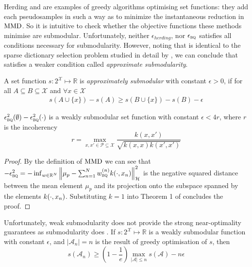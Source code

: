 \documentclass[]{article}
\begin{document}
Herding and \sbq{} are examples of greedy algorithms optimising set functions: they add each pseudosamples in such a way as to minimize the instantaneous reduction in ${\rm MMD}$. So it is intuitive to check whether the objective functions these methods minimise are submodular. Unfortunately, neither $\epsilon_{herding}$, nor $\epsilon_{{\textsc{bq}}{}}$ satisfies all conditions necessary for submodularity. However, noting that \sbq{} is identical to the sparse dictionary selection problem studied in detail by \citet{KrauseCevher10}, we can conclude that \sbq{} satisfies a weaker condition called \emph{approximate submodularity}. 

A set function $s:2^\mathcal{X} \mapsto \mathbb{R}$ is \textit{approximately submodular} with constant $\epsilon>0$, if for all $A\subseteq B\subseteq \mathcal{X}$ and $\forall x \in \mathcal{X}$
%
\begin{align}
s(A\cup\{x\})-s(A)\geq s(B\cup\{x\})-s(B) - \epsilon
\end{align}

\begin{prop}\label{prop:submodularity_SBQ}
$\epsilon^{2}_{{\textsc{bq}}{}}(\emptyset)-\epsilon^{2}_{{\textsc{bq}}{}}(\cdot)$ is a weakly submodular set function with constant $\epsilon<4r$, where $r$ is the incoherency
\begin{equation}
	r = \max_{x,x'\in\mathcal{P}\subseteq\mathcal{X}} \frac{k(x,x')}{\sqrt{k(x,x)k(x',x')}}
\end{equation}
\end{prop}
\begin{proof} By the definition of ${\rm MMD}$ we can see that
$-\epsilon^{2}_{{\textsc{bq}}{}} = -\inf_{w\in\mathbb{R}^N}\left\|\mu_p - \sum_{n=1}^N w^{(n)}_{{\textsc{bq}}{}}k(\cdot,{x}_n)\right\|_{\mathcal{H}}^2$ is the negative squared distance between the mean element $\mu_p$ and its projection onto the subspace spanned by the elements $k(\cdot,{x}_n)$. Substituting $k=1$ into Theorem 1 of \citet{KrauseCevher10} concludes the proof.
\end{proof}

Unfortunately, weak submodularity does not provide the strong near-optimality guarantees as submodularity does . If $s:2^\mathcal{X} \mapsto \mathbb{R}$ is a weakly submodular function with constant $\epsilon$, and $\vert\mathcal{A}_n\vert=n$ is the result of greedy optimisation of $s$, then
\begin{equation}
	s(\mathcal{A}_n) \geq \left(1-\frac{1}{e}\right)\max_{\vert\mathcal{A}\vert\leq n}s(\mathcal{A}) - n\epsilon
\end{equation}
\end{document}
